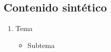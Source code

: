 \documentclass[10pt,letterpaper]{article}
\begin{document}
\begin{multicols}{2}
\section*{Contenido sintético}
\color{black}
\begin{enumerate}
  \itemsep-0.3em
	\item Tema
	\begin{itemize}
		\item Subtema
	\end{itemize}
\end{enumerate}

\nocite{IEEEhowto:IEEEtranpage,IEEEexample:shellCTANpage,IEEEexample:IEEEwebsite}


\end{multicols}
\end{document}
